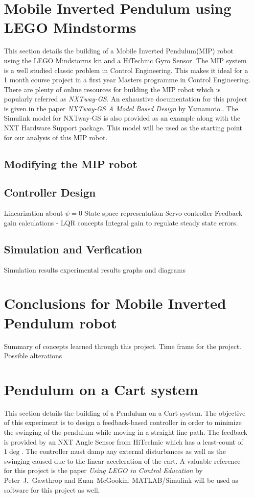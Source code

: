\documentclass[paper=a4, fontsize=11pt]{scrartcl}
\numberwithin{equation}{section}        %
\numberwithin{figure}{section}          %
\numberwithin{table}{section}           %
\begin{document}
\section{Mobile Inverted Pendulum using LEGO Mindstorms}
This section details the building of a Mobile Inverted Pendulum(MIP) robot using the LEGO Mindstorms kit and a HiTechnic Gyro Sensor. The MIP system is a well studied classic problem in Control Engineering. This makes it ideal for a 1 month course project in a first year Masters programme in Control Engineering. There are plenty of online resources for building the MIP robot which is popularly referred as \emph{NXTway-GS}. An exhaustive documentation for this project is given in the paper \emph{NXTway-GS A Model Based Design} by Yamamoto.\cite{ref:Yamamoto}. The Simulink model for NXTway-GS is also provided as an example along with the NXT Hardware Support package. This model will be used as the starting point for our analysis of this MIP robot. 

\subsection{Modifying the MIP robot}


\subsection{Controller Design}
Linearization about $\psi = 0$
State space representation 
Servo controller
Feedback gain calculations - LQR concepts
Integral gain to regulate steady state errors.

\subsection{Simulation and Verfication}
Simulation results
experimental results
graphs and diagrams

\section{Conclusions for Mobile Inverted Pendulum robot}
Summary of concepts learned through this project.
Time frame for the project.
Possible alterations

\section{Pendulum on a Cart system}
This section details the building of a Pendulum on a Cart system. The objective of this experiment is to design a feedback-based controller in order to minimize the swinging of the pendulum while moving in a straight line path. The feedback is provided by an NXT Angle Sensor from HiTechnic which has a least-count of $1\deg$. The controller must damp any external disturbances as well as the swinging caused due to the linear acceleration of the cart. A valuable reference for this project is the paper \emph{Using LEGO in Control Education} by Peter~J.~Gawthrop and Euan~McGookin\cite{ref:gawthrop}. MATLAB/Simulink will be used as software for this project as well. 
\end{document}
